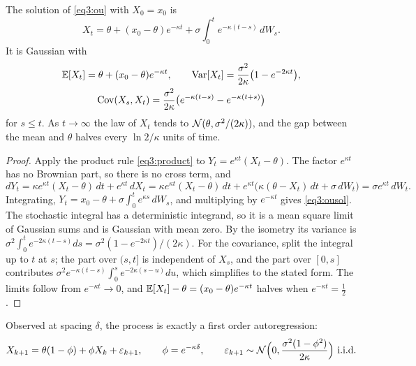 \begin{chapterrefs}
\begin{proposition}\label{prop3:ou}
The solution of \cref{eq3:ou} with $X_0=x_0$ is
\begin{equation}\label{eq3:ousol}
  X_t = \theta+(x_0-\theta)e^{-\kappa t}+\sigma\int_0^te^{-\kappa(t-s)}\,dW_s .
\end{equation}
It is Gaussian with
\begin{gather}\label{eq3:oumoments}
  \mathbb{E}[X_t]=\theta+(x_0-\theta)e^{-\kappa t},\qquad
  \operatorname{Var}[X_t]=\frac{\sigma^2}{2\kappa}\bigl(1-e^{-2\kappa t}\bigr),\\
  \operatorname{Cov}(X_s,X_t)=\frac{\sigma^2}{2\kappa}\bigl(e^{-\kappa(t-s)}-e^{-\kappa(t+s)}\bigr)\notag
\end{gather}
for $s\le t$. As $t\to\infty$ the law of $X_t$ tends to $\mathcal{N}(\theta,\sigma^2/(2\kappa))$, and the gap between
the mean and $\theta$ halves every $\ln 2/\kappa$ units of time.
\end{proposition}

\begin{proof}
Apply the product rule \cref{eq3:product} to $Y_t=e^{\kappa t}(X_t-\theta)$. The factor $e^{\kappa t}$
has no Brownian part, so there is no cross term, and
\begin{equation*}
  dY_t=\kappa e^{\kappa t}(X_t-\theta)\,dt+e^{\kappa t}\,dX_t
  =\kappa e^{\kappa t}(X_t-\theta)\,dt+e^{\kappa t}\bigl(\kappa(\theta-X_t)\,dt+\sigma\,dW_t\bigr)
  =\sigma e^{\kappa t}\,dW_t .
\end{equation*}
Integrating, $Y_t=x_0-\theta+\sigma\int_0^te^{\kappa s}\,dW_s$, and multiplying by $e^{-\kappa t}$ gives
\cref{eq3:ousol}. The stochastic integral has a deterministic integrand, so it is a mean square limit
of Gaussian sums and is Gaussian with mean zero. By the isometry its variance is
$\sigma^2\int_0^te^{-2\kappa(t-s)}ds=\sigma^2(1-e^{-2\kappa t})/(2\kappa)$. For the covariance, split the
integral up to $t$ at $s$; the part over $(s,t]$ is independent of $X_s$, and the part over $[0,s]$
contributes $\sigma^2e^{-\kappa(t-s)}\int_0^se^{-2\kappa(s-u)}du$, which simplifies to the stated form.
The limits follow from $e^{-\kappa t}\to0$, and $\mathbb{E}[X_t]-\theta=(x_0-\theta)e^{-\kappa t}$ halves when
$e^{-\kappa t}=\tfrac12$.
\end{proof}

\begin{corollary}\label{cor3:ar1}
Observed at spacing $\delta$, the process is exactly a first order autoregression:
\begin{equation}\label{eq3:ar1}
  X_{k+1}=\theta(1-\phi)+\phi X_k+\varepsilon_{k+1},\qquad
  \phi=e^{-\kappa\delta},\qquad \varepsilon_{k+1}\sim\N\Bigl(0,\frac{\sigma^2(1-\phi^2)}{2\kappa}\Bigr)\ \text{i.i.d.}
\end{equation}
\end{corollary}


\end{chapterrefs}
